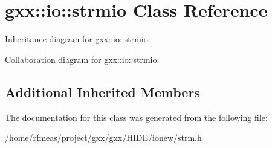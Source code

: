 \hypertarget{classgxx_1_1io_1_1strmio}{}\section{gxx\+:\+:io\+:\+:strmio Class Reference}
\label{classgxx_1_1io_1_1strmio}


Inheritance diagram for gxx\+:\+:io\+:\+:strmio\+:


Collaboration diagram for gxx\+:\+:io\+:\+:strmio\+:
\subsection*{Additional Inherited Members}


The documentation for this class was generated from the following file\+:\begin{DoxyCompactItemize}
\item 
/home/rfmeas/project/gxx/gxx/\+H\+I\+D\+E/ionew/strm.\+h\end{DoxyCompactItemize}
